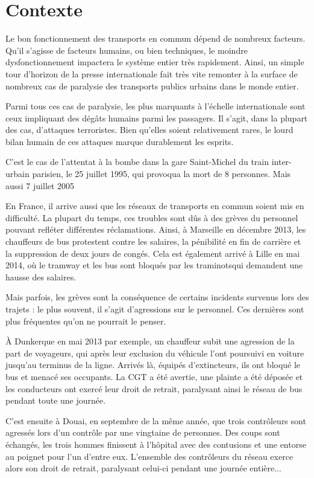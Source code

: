 \chapter{Contexte}
	Le bon fonctionnement des transports en commun dépend de nombreux facteurs. Qu'il s'agisse de facteurs humains, ou bien techniques, le moindre dysfonctionnement impactera le système entier très rapidement. Ainsi, un simple tour d'horizon de la presse internationale fait très vite remonter à la surface de nombreux cas de paralysie des transports publics urbains dans le monde entier.

	Parmi tous ces cas de paralysie, les plus marquants à l'échelle internationale sont ceux impliquant des dégâts humains parmi les passagers. Il s'agit, dans la plupart des cas, d'attaques terroristes. Bien qu'elles soient relativement rares, le lourd bilan humain de ces attaques marque durablement les esprits.

	C'est le cas de l'attentat à la bombe dans la gare Saint-Michel du train inter-urbain parisien, le 25 juillet 1995, qui provoqua la mort de 8 personnes. Mais aussi 7 juillet 2005

	En France, il arrive aussi que les réseaux de transports en commun soient mis en difficulté. La plupart du temps, ces troubles sont dûs à des grèves du personnel pouvant refléter différentes réclamations. Ainsi, à Marseille en décembre 2013, les chauffeurs de bus protestent contre les salaires, la pénibilité en fin de carrière et la suppression de deux jours de congés. Cela est également arrivé à Lille en mai 2014, où le tramway et les bus sont bloqués par les traminotsqui demandent une hausse des salaires.

	Mais parfois, les grèves sont la conséquence de certains incidents survenus lors des trajets : le plus souvent, il s'agit d'agressions sur le personnel. Ces dernières sont plus fréquentes qu'on ne pourrait le penser.

	À Dunkerque en mai 2013 par exemple, un chauffeur subit une agression de la part de voyageurs, qui après leur exclusion du véhicule l'ont poursuivi en voiture jusqu'au terminus de la ligne. Arrivés là, équipés d'extincteurs, ils ont bloqué le bus et menacé ses occupants. La CGT a été avertie, une plainte a été déposée et les conducteurs ont exercé leur droit de retrait, paralysant ainsi le réseau de bus pendant toute une journée.

	C'est ensuite à Douai, en septembre de la même année, que trois contrôleurs sont agressés lors d'un contrôle par une vingtaine de personnes. Des coups sont échangés, les trois hommes finissent à l'hôpital avec des contusions et une entorse au poignet pour l'un d'entre eux. L'ensemble des contrôleurs du réseau exerce alors son droit de retrait, paralysant celui-ci pendant une journée entière...

